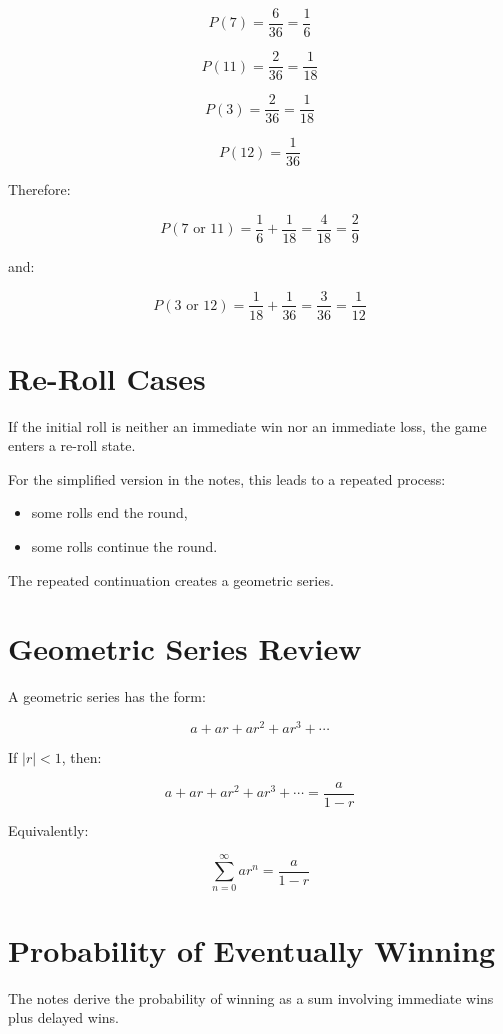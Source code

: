 \documentclass[11pt]{article}
\begin{document}
\[
P(7) = \frac{6}{36} = \frac{1}{6}
\]

\[
P(11) = \frac{2}{36} = \frac{1}{18}
\]

\[
P(3) = \frac{2}{36} = \frac{1}{18}
\]

\[
P(12) = \frac{1}{36}
\]

Therefore:

\[
P(7 \text{ or } 11) = \frac{1}{6} + \frac{1}{18}
= \frac{4}{18}
= \frac{2}{9}
\]

and:

\[
P(3 \text{ or } 12) = \frac{1}{18} + \frac{1}{36}
= \frac{3}{36}
= \frac{1}{12}
\]

\section{Re-Roll Cases}

If the initial roll is neither an immediate win nor an immediate loss, the game enters a re-roll state.

For the simplified version in the notes, this leads to a repeated process:

\begin{itemize}
    \item some rolls end the round,
    \item some rolls continue the round.
\end{itemize}

The repeated continuation creates a geometric series.

\section{Geometric Series Review}

A geometric series has the form:

\[
a + ar + ar^2 + ar^3 + \cdots
\]

If \(|r| < 1\), then:

\[
a + ar + ar^2 + ar^3 + \cdots = \frac{a}{1-r}
\]

Equivalently:

\[
\sum_{n=0}^{\infty} ar^n = \frac{a}{1-r}
\]

\section{Probability of Eventually Winning}

The notes derive the probability of winning as a sum involving immediate wins plus delayed wins.
\end{document}

